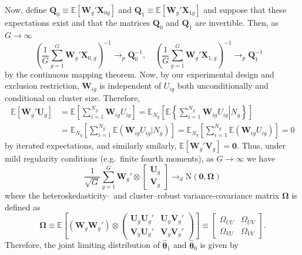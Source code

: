 Now, define $\mathbf{Q}_0 \equiv \mathbb{E}[\mathbf{W}_g'\mathbf{X}_{0g}]$ and $\mathbf{Q}_1 \equiv \mathbb{E}[\mathbf{W}_g'\mathbf{X}_{1g}]$ and suppose that these expectations exist and that the matrices $\mathbf{Q}_0$ and $\mathbf{Q}_1$ are invertible. Then, as $G \rightarrow \infty$
\[
 \left( \frac{1}{G} \sum_{g=1}^G \mathbf{W}_g' \mathbf{X}_{0,g}\right)^{-1} \rightarrow_p \mathbf{Q}_0^{-1}, \quad
 \left( \frac{1}{G} \sum_{g=1}^G \mathbf{W}_g' \mathbf{X}_{1,g}\right)^{-1} \rightarrow_p \mathbf{Q}_1^{-1} \quad
\]
by the continuous mapping theorem.
Now, by our experimental design and exclusion restriction, $\mathbf{W}_{ig}$ is independent of $U_{ig}$ both unconditionally and conditional on cluster size. 
Therefore,
\begin{align*}
\mathbb{E}[\mathbf{W}_g' \mathbf{U}_g] &=  \mathbb{E}\left[ \sum_{i=1}^{N_g} \mathbf{W}_{ig} U_{ig} \right] = \mathbb{E}_{N_g}\left[ \mathbb{E}\left\{\left. \sum_{i=1}^{N_g} \mathbf{W}_{ig} U_{ig} \right| N_g \right\}\right]\\
&= \mathbb{E}_{N_g}\left[ \sum_{i=1}^{N_g} \mathbb{E}(\mathbf{W}_{ig} U_{ig}|N_g)\right] = \mathbb{E}_{N_g}\left[ \sum_{i=1}^{N_g} \mathbb{E}(\mathbf{W}_{ig}U_{ig})\right] = 0
\end{align*}
by iterated expectations, and similarly smilarly, $\mathbb{E}[\mathbf{W}_g'\mathbf{V}_g] = \mathbf{0}$. 
Thus, under mild regularity conditions (e.g.\ finite fourth moments), as $G \rightarrow \infty$  we have
\[
\frac{1}{\sqrt{G}} \sum_{g=1}^G \mathbf{W}_g' \otimes \begin{bmatrix} \mathbf{U}_g \\ \mathbf{V}_g \end{bmatrix} \rightarrow_d \text{N}(\mathbf{0}, \boldsymbol{\Omega})
\]
where the heteroskedasticity-- and cluster--robust variance-covariance matrix $\boldsymbol{\Omega}$ is defined as
\[
\boldsymbol{\Omega} \equiv 
 \mathbb{E} \left[\left(\mathbf{W}_g \mathbf{W}_g' \right)\otimes \begin{pmatrix}
\mathbf{U}_g \mathbf{U}_g' & \mathbf{U}_g \mathbf{V}_g' \\
\mathbf{V}_g \mathbf{U}_g' & \mathbf{V}_g \mathbf{V}_g'  
\end{pmatrix} \right] \equiv \begin{bmatrix}
\Omega_{UU} & \Omega_{UV} \\
\Omega_{VU} & \Omega_{VV}
\end{bmatrix}.
\]
Therefore, the joint limiting distribution of $\widehat{\boldsymbol{\theta}}_1$ and $\widehat{\boldsymbol{\theta}}_0$ is given by
